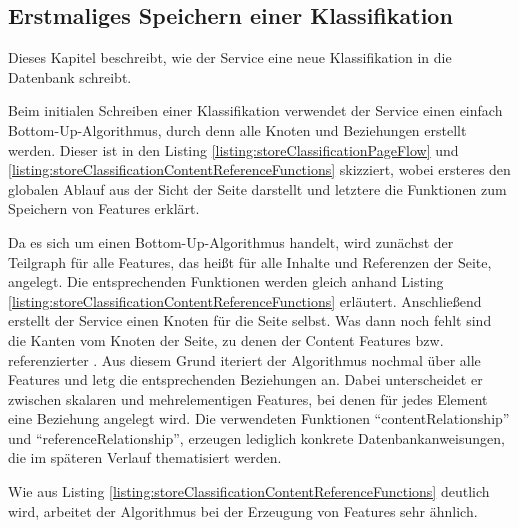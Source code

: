 \subsection{Erstmaliges Speichern einer Klassifikation}
    \label{section:solutionDetailsStorageAPIInitialWrite}
    Dieses Kapitel beschreibt, wie der Service eine neue Klassifikation in die Datenbank schreibt.

    Beim initialen Schreiben einer Klassifikation verwendet der Service einen
    einfach Bottom-Up-Algorithmus, durch denn alle Knoten und Beziehungen erstellt werden.
    Dieser ist in den Listing \ref{listing:storeClassificationPageFlow} und
    \ref{listing:storeClassificationContentReferenceFunctions} skizziert,
    wobei ersteres den globalen Ablauf aus der Sicht der Seite darstellt und
    letztere die Funktionen zum Speichern von Features erklärt.
    
    

    Da es sich um einen Bottom-Up-Algorithmus handelt,
    wird zunächst der Teilgraph für alle Features,
    das heißt für alle Inhalte und Referenzen der Seite, angelegt.
    Die entsprechenden Funktionen werden gleich anhand Listing \ref{listing:storeClassificationContentReferenceFunctions} erläutert.
    Anschließend erstellt der Service einen Knoten für die Seite selbst.
    Was dann noch fehlt sind die Kanten vom Knoten der Seite,
    zu denen der Content Features bzw. referenzierter {\resources}.
    Aus diesem Grund iteriert der Algorithmus nochmal über alle Features
    und letg die entsprechenden Beziehungen an.
    Dabei unterscheidet er zwischen skalaren und mehrelementigen Features,
    bei denen für jedes Element eine Beziehung angelegt wird.
    Die verwendeten Funktionen "`contentRelationship"' und "`referenceRelationship"',
    erzeugen lediglich konkrete Datenbankanweisungen, die im späteren Verlauf thematisiert werden.

    Wie aus Listing \ref{listing:storeClassificationContentReferenceFunctions} deutlich wird,
    arbeitet der Algorithmus bei der Erzeugung von Features sehr ähnlich.

    

